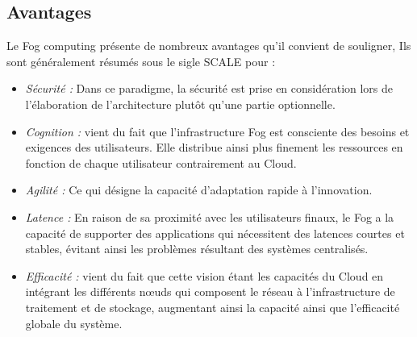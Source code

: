 \subsection{Avantages}
Le Fog computing présente de nombreux avantages qu'il convient de souligner, Ils sont généralement résumés sous le sigle SCALE pour :
\begin{itemize}
  \item \emph{Sécurité :} Dans ce paradigme, la sécurité est prise en considération lors de l'élaboration de l'architecture plutôt qu'une partie optionnelle.
  \item \emph{Cognition :} vient du fait que l'infrastructure Fog est consciente des besoins et exigences des utilisateurs. Elle distribue ainsi plus finement les ressources en fonction de chaque utilisateur contrairement au Cloud.
  \item \emph{Agilité :} Ce qui désigne la capacité d'adaptation rapide à l'innovation.
  \item \emph{Latence :} En raison de sa proximité avec les utilisateurs finaux, le Fog a la capacité de supporter des applications qui nécessitent des latences courtes et stables, évitant ainsi les problèmes résultant des systèmes centralisés.
  \item \emph{Efficacité :} vient du fait que cette vision étant les capacités du Cloud en intégrant
  les différents nœuds qui composent le réseau à l'infrastructure de traitement et de stockage, augmentant ainsi la capacité ainsi que l'efficacité globale du système.
\end{itemize}

